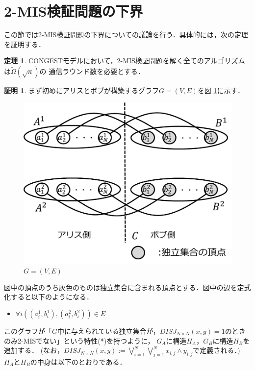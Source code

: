 \documentclass[12pt]{thesis}
\newcommand{\CONGEST}{\textsf{CONGEST}}
\theoremstyle{definition}
\newtheorem{theorem}{定理}[chapter]
\newtheorem*{prf*}{証明}
\begin{document}
\section{2-MIS検証問題の下界}

この節では2-MIS検証問題の下界についての議論を行う．具体的には，次の定理を証明する．
\begin{theorem}
{\CONGEST}モデルにおいて，2-MIS検証問題を解く全てのアルゴリズムは$\tilde{\Omega} (\sqrt{n})$の
通信ラウンド数を必要とする．
\end{theorem}
\begin{prf*}
まず初めにアリスとボブが構築するグラフ$G = (V, E)$を図 \ref{2_G}に示す． 

\begin{figure}[ht]
\begin{center}
\includegraphics[width=120mm]{2_G.png}
\end{center}
\caption{$G = (V, E)$}
\label{2_G}
\end{figure}

図中の頂点のうち灰色のものは独立集合に含まれる頂点とする．図中の辺を定式化すると以下のようになる．
\begin{itemize}
\item $\forall i((a_{i}^{1}, b_{i}^{1}), (a_{i}^{2}, b_{i}^{2})) \in E$
\end{itemize}

このグラフが「$G$中に与えられている独立集合が，$DISJ_{N \times N} (x, y) = 1$のときのみ2-MISでない」という特性(*)を持つように，
$G_{A}$に構造$H_{A}$，$G_{B}$に構造$H_{B}$を追加する．
(なお，$DISJ_{N \times N} (x, y) :=\bigvee_{i = 1}^{N} \bigvee_{j = 1}^{N} x_{i, j} \land y_{i, j}$で定義される．)
$H_{A}$と$H_{B}$の中身は以下のとおりである．


\end{prf*}
\end{document}
